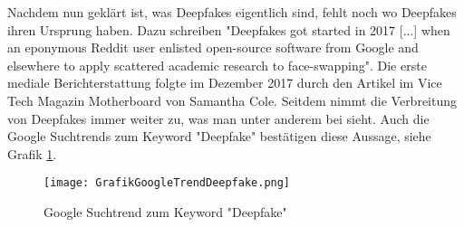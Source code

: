 Nachdem nun geklärt ist, was Deepfakes eigentlich sind, fehlt noch wo Deepfakes ihren Ursprung \cite{AIAssistedFakePorn2017} haben. 
Dazu schreiben \textcite{kernerPornDiscreditationEpistemic2021} "Deepfakes got started in 2017 [...] when an eponymous Reddit user enlisted open-source software from Google and elsewhere to apply scattered academic research to face-swapping". 
Die erste mediale Berichterstattung folgte im Dezember 2017 durch den Artikel \textcite{AIAssistedFakePorn2017} im Vice Tech Magazin Motherboard von Samantha Cole.
Seitdem nimmt die Verbreitung von Deepfakes immer weiter zu, was man unter anderem bei \textcite{ranaDeepfakeDetectionSystematic2022,westerlundEmergenceDeepfakeTechnology2019,gamagePDFEmergenceDeepfakes} sieht. 
Auch die Google Suchtrends zum Keyword "Deepfake" bestätigen diese Aussage, siehe Grafik \ref{fig:suchtrend-grafik}.
\begin{figure} [htbp]
    \centering
    \texttt{[image: GrafikGoogleTrendDeepfake.png]}
    \caption{Google Suchtrend zum Keyword "Deepfake"}
    \label{fig:suchtrend-grafik}
\end{figure}

